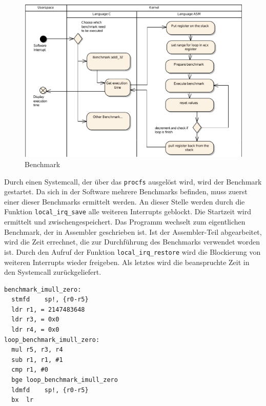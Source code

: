 \begin{figure}[H]
\centering
\includegraphics[width=1.0\textwidth]{images/benchmark_ea.pdf}
\caption{Benchmark}
\label{fig:Benchmark}
\end{figure}


Durch einen Systemcall, der über das \texttt{procfs} ausgelöst wird, wird der Benchmark gestartet. Da sich in der Software mehrere Benchmarks befinden, muss zuerst einer dieser Benchmarks ermittelt werden. An dieser Stelle werden durch die Funktion \texttt{local\_irq\_save} alle weiteren Interrupts geblockt. Die Startzeit wird ermittelt und zwischengespeichert. Das Programm wechselt zum eigentlichen Benchmark, der in Assembler geschrieben ist. Ist der Assembler-Teil abgearbeitet, wird die Zeit errechnet, die zur Durchführung des Benchmarks verwendet worden ist. Durch den Aufruf der Funktion \texttt{local\_irq\_restore} wird die Blockierung von weiteren Interrupts wieder freigeben. Als letztes wird die beanspruchte Zeit in den Systemcall zurückgeliefert.

\lstset{language=[x64]Assembler}
\begin{lstlisting}[label={list:asm_benchmark},caption={Benchmark in Assembler}]
benchmark_imull_zero:
  stmfd    sp!, {r0-r5}
  ldr r1, = 2147483648
  ldr r3, = 0x0
  ldr r4, = 0x0
loop_benchmark_imull_zero:
  mul r5, r3, r4
  sub r1, r1, #1
  cmp r1, #0
  bge loop_benchmark_imull_zero
  ldmfd    sp!, {r0-r5}
  bx  lr
\end{lstlisting}

